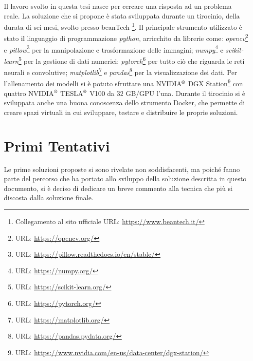 Il lavoro svolto in questa tesi nasce per cercare una risposta ad un problema reale.
La soluzione che si propone è stata sviluppata durante un tirocinio, della durata di sei mesi, svolto presso beanTech \footnote{Collegamento al sito ufficiale URL: \url{https://www.beantech.it/}}.
Il principale strumento utilizzato è stato il linguaggio di programmazione \textit{python}, arricchito da librerie come:
\textit{opencv}\footnote{URL: \url{https://opencv.org/}} e \textit{pillow}\footnote{URL: \url{https://pillow.readthedocs.io/en/stable/}} per la manipolazione e trasformazione delle immagini; 
\textit{numpy}\footnote{URL: \url{https://numpy.org/}} e \textit{scikit-learn}\footnote{URL: \url{https://scikit-learn.org/}} per la gestione di dati numerici;
\textit{pytorch}\footnote{URL: \url{https://pytorch.org/}} per tutto ciò che riguarda le reti neurali e convolutive;
\textit{matplotlib}\footnote{URL: \url{https://matplotlib.org/}} e \textit{pandas}\footnote{URL: \url{https://pandas.pydata.org/}} per la visualizzazione dei dati.
Per l'allenamento dei modelli si è potuto sfruttare una NVIDIA$^{\text{\textregistered}}$ DGX Station\footnote{URL: \url{https://www.nvidia.com/en-us/data-center/dgx-station/}} con quattro NVIDIA$^{\text{\textregistered}}$ TESLA$^{\text{\textregistered}}$ V100 da 32 GB/GPU l'una.
Durante il tirocinio si è sviluppata anche una buona conoscenza dello strumento Docker, che permette di creare spazi virtuali in cui sviluppare, testare e distribuire le proprie soluzioni.

\section{Primi Tentativi}
Le prime soluzioni proposte si sono rivelate non soddisfacenti, ma poiché fanno parte del percorso che ha portato allo sviluppo della soluzione descritta in questo documento, si è deciso di dedicare un breve commento alla tecnica che più si discosta dalla soluzione finale.

